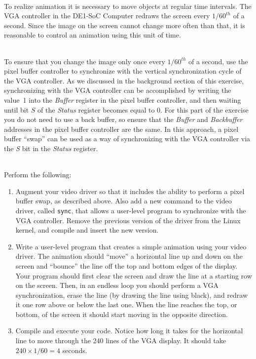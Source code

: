 \documentclass[epsfig,10pt,fullpage]{article}
\begin{document}
~\\
\noindent
To realize animation it is necessary to move objects at regular time intervals. The VGA controller 
in the DE1-SoC Computer redraws the screen every $1/60^{th}$ of a second. Since the image on 
the screen cannot change more often than that, it is reasonable to control an animation
using this unit of time.

~\\
\noindent
To ensure that you change the image only once every $1/60^{th}$ of a second, use the 
pixel buffer controller to synchronize with the vertical synchronization cycle of the VGA 
controller. As we discussed in the background section of this exercise, synchronizing with the 
VGA controller can be accomplished by writing the value~1 into the {\it Buffer} register in the 
pixel buffer controller, and then waiting until bit $S$ of the {\it Status} register becomes 
equal to 0. For this part of the exercise you do not need to use a back buffer, so ensure
that the {\it Buffer} and {\it Backbuffer} addresses in the pixel buffer controller are the 
same. In this approach, a pixel buffer ``swap'' can be used as a way of synchronizing with 
the VGA controller via the {\it S} bit in the {\it Status} register.

~\\
\noindent
Perform the following:

\begin{enumerate}

\item Augment your video driver so that it includes the ability to perform a pixel buffer swap,
as described above. Also add a new command to the video driver, called \texttt{sync}, that allows
a user-level program to synchronize with the VGA controller. Remove the previous version
of the driver from the Linux kernel, and compile and insert the new version.
\item Write a user-level program that creates a simple animation using your video driver. The
animation should ``move'' a horizontal line up and down on the screen and ``bounce'' the line 
off the top and bottom edges of the display. Your program should first clear the screen and
draw the line at a starting row on the screen. Then, in an endless loop you should perform
a VGA synchronization, erase the line (by drawing the line using black), and redraw it one row
above or below the last one. When the line reaches the top, or bottom, of the screen it should
start moving in the opposite direction.

\item Compile and execute your code. Notice how long it takes for the 
horizontal line to move through the 240 lines of the VGA display. It should take 
$240 \times 1/60 = 4$ seconds.
\end{enumerate}
\end{document}
